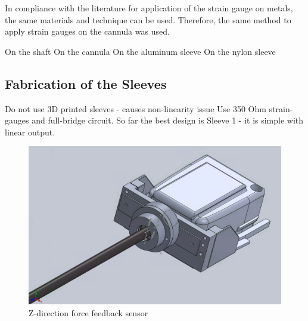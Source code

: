 	In compliance with the literature \cite{StrGugeInst} for application of the strain gauge on metals, the same materials and technique can be used. Therefore, the same method to apply strain gauges on the cannula was used.

	On the shaft
	On the cannula
	On the aluminum sleeve
	On the nylon sleeve

	\subsection{Fabrication of the Sleeves}
	\label{sec:sleevesFabr}

	Do not use 3D printed sleeves - causes non-linearity issue
	Use 350 Ohm strain-gauges and full-bridge circuit.
	So far the best design is Sleeve 1 - it is simple with linear output.

		\begin{figure}
			\begin{center}
			\includegraphics[width=120mm]{fig/methods/z_dir.png}
			\end{center}
			\vspace{-4mm}
		\caption[Z-direction force feedback sensor]
		{Z-direction force feedback sensor}
		\label{fig:Z-direction}
		\vspace{-2mm}
		\end{figure}

